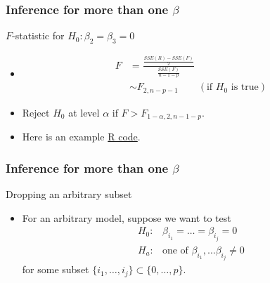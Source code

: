 \documentclass[handout]{beamer}
\begin{document}
   \begin{frame} \frametitle{Inference for more than one $\beta$}

   \begin{block}
   {$F$-statistic for $H_0:\beta_2=\beta_3=0$}
   \begin{itemize}
   \item
   \begin{equation}
   \begin{aligned}
   F &=\frac{\frac{SSE(R) - SSE(F)}{2}}{\frac{SSE(F)}{n-1-p}} \\
   & \sim F_{2, n-p-1}       \qquad   (\text{if $H_0$ is true})
   \end{aligned}
   \end{equation}
   \item Reject $H_0$ at level $\alpha$ if $F > F_{1-\alpha, 2, n-1-p}$.

   \item Here is an example \href{http://stats191.stanford.edu/multiple.html}{R code}.
   \end{itemize}
   \end{block}
   \end{frame}


   \begin{frame} \frametitle{Inference for more than one $\beta$}

   \begin{block}
   {Dropping an arbitrary subset}
   \begin{itemize}
   \item For an arbitrary model, suppose we want to test
   $$    \begin{aligned}
   H_0:&\beta_{i_1}=\dots=\beta_{i_j}=0 \\
   H_a:& \text{one of $\beta_{i_1}, \dots \beta_{i_j} \neq 0$}
   \end{aligned}
   $$
   for some subset $\{i_1, \dots, i_j\} \subset \{0, \dots, p\}$.

   \end{itemize}
   \end{block}
   \end{frame}

\end{document}
